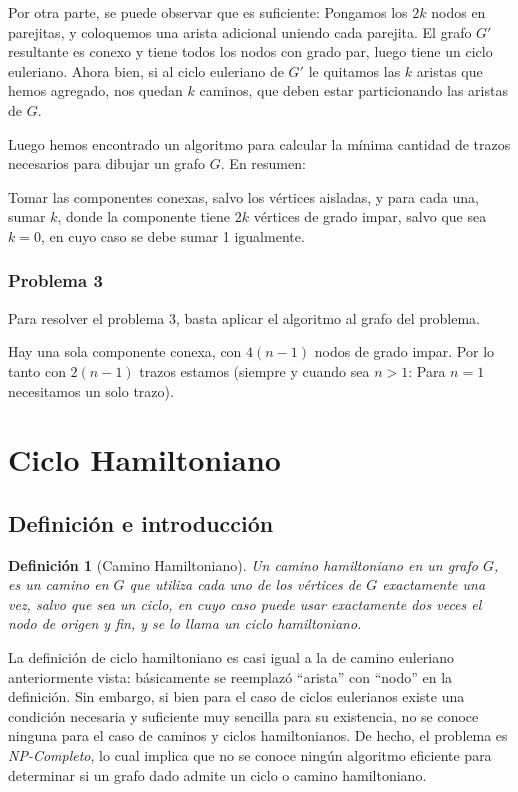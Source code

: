 \documentclass{article}
\newtheorem{definicion}{{\sc Definición}}
\begin{document}
Por otra parte, se puede observar que es suficiente: Pongamos los $2k$ nodos en parejitas, y coloquemos una arista adicional uniendo
cada parejita. El grafo $G'$ resultante es conexo y tiene todos los nodos con grado par, luego tiene un ciclo euleriano. Ahora bien,
si al ciclo euleriano de $G'$ le quitamos las $k$ aristas que hemos agregado, nos quedan $k$ caminos, que deben estar particionando las
aristas de $G$.

Luego hemos encontrado un algoritmo para calcular la mínima cantidad de trazos necesarios para dibujar un grafo $G$. En resumen:

Tomar las componentes conexas, salvo los vértices aisladas, y para cada una, sumar $k$, donde la componente tiene $2k$ vértices de grado impar,
salvo que sea $k=0$, en cuyo caso se debe sumar 1 igualmente.

\subsubsection{Problema 3}

Para resolver el problema 3, basta aplicar el algoritmo al grafo del problema.

Hay una sola componente conexa, con $4(n-1)$ nodos de grado impar. Por lo tanto con $2(n-1)$ trazos estamos (siempre y cuando sea $n > 1$: Para
$n = 1$ necesitamos un solo trazo).

\pagebreak

\section{Ciclo Hamiltoniano}

\subsection{Definición e introducción}

\begin{definicion}[Camino Hamiltoniano]
Un camino hamiltoniano en un grafo $G$, es un camino en $G$ que utiliza cada uno de los vértices de $G$ exactamente una vez, salvo que
sea un ciclo, en cuyo caso puede usar exactamente dos veces el nodo de origen y fin, y se lo llama un ciclo hamiltoniano.
\end{definicion}

La definición de ciclo hamiltoniano es casi igual a la de camino euleriano anteriormente vista: básicamente se reemplazó ``arista'' con ``nodo''
en la definición. Sin embargo, si bien para el caso de ciclos eulerianos existe una condición necesaria y suficiente muy sencilla para su existencia,
no se conoce ninguna para el caso de caminos y ciclos hamiltonianos. De hecho, el problema es \textit{NP-Completo}, lo cual implica que no se
conoce ningún algoritmo eficiente para determinar si un grafo dado admite un ciclo o camino hamiltoniano.
\end{document}
